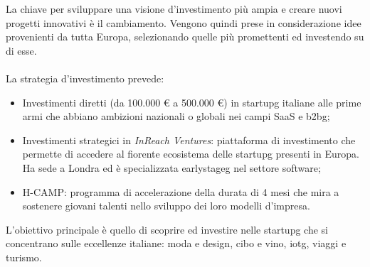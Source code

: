 La chiave per sviluppare una visione d'investimento più ampia e creare nuovi progetti innovativi è il cambiamento. Vengono quindi prese in considerazione idee provenienti da tutta Europa, selezionando quelle più promettenti ed investendo su di esse.
\\ \\
La strategia d'investimento prevede:
\begin{itemize}
	\item Investimenti diretti (da 100.000 \euro{} a 500.000 \euro) in \gls{startupg}\glsfirstoccur{} italiane alle prime armi che abbiano ambizioni nazionali o globali nei campi SaaS e \gls{b2bg}\glsfirstoccur;
	\item Investimenti strategici in \textit{InReach Ventures}: piattaforma di investimento che permette di accedere al fiorente ecosistema delle \gls{startupg}\glsfirstoccur{} presenti in Europa. Ha sede a Londra ed è specializzata \gls{earlystageg}\glsfirstoccur{} nel settore software;
	\item H-CAMP: programma di accelerazione della durata di 4 mesi che mira a sostenere giovani talenti nello sviluppo dei loro modelli d'impresa.
\end{itemize}

L'obiettivo principale è quello di scoprire ed investire nelle \gls{startupg}\glsfirstoccur{} che si concentrano sulle eccellenze italiane: moda e design, cibo e vino, \gls{iotg}\glsfirstoccur, viaggi e turismo.


